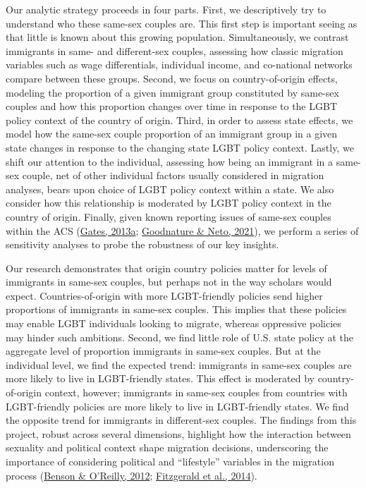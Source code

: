 \documentclass[
  11pt,
]{article}
\begin{document}
Our analytic strategy proceeds in four parts. First, we descriptively try to understand who these same-sex couples are. This first step is important seeing as that little is known about this growing population. Simultaneously, we contrast immigrants in same- and different-sex couples, assessing how classic migration variables such as wage differentials, individual income, and co-national networks compare between these groups. Second, we focus on country-of-origin effects, modeling the proportion of a given immigrant group constituted by same-sex couples and how this proportion changes over time in response to the LGBT policy context of the country of origin. Third, in order to assess state effects, we model how the same-sex couple proportion of an immigrant group in a given state changes in response to the changing state LGBT policy context. Lastly, we shift our attention to the individual, assessing how being an immigrant in a same-sex couple, net of other individual factors usually considered in migration analyses, bears upon choice of LGBT policy context within a state. We also consider how this relationship is moderated by LGBT policy context in the country of origin. Finally, given known reporting issues of same-sex couples within the ACS (\protect\hyperlink{ref-gates_2013}{Gates, 2013a}; \protect\hyperlink{ref-goodnature_2021}{Goodnature \& Neto, 2021}), we perform a series of sensitivity analyses to probe the robustness of our key insights.

Our research demonstrates that origin country policies matter for levels of immigrants in same-sex couples, but perhaps not in the way scholars would expect. Countries-of-origin with more LGBT-friendly policies send higher proportions of immigrants in same-sex couples. This implies that these policies may enable LGBT individuals looking to migrate, whereas oppressive policies may hinder such ambitions. Second, we find little role of U.S. state policy at the aggregate level of proportion immigrants in same-sex couples. But at the individual level, we find the expected trend: immigrants in same-sex couples are more likely to live in LGBT-friendly states. This effect is moderated by country-of-origin context, however; immigrants in same-sex couples from countries with LGBT-friendly policies are more likely to live in LGBT-friendly states. We find the opposite trend for immigrants in different-sex couples. The findings from this project, robust across several dimensions, highlight how the interaction between sexuality and political context shape migration decisions, underscoring the importance of considering political and ``lifestyle'' variables in the migration process (\protect\hyperlink{ref-benson_2012}{Benson \& O'Reilly, 2012}; \protect\hyperlink{ref-fitzgerald_2014}{Fitzgerald et al., 2014}).
\end{document}
